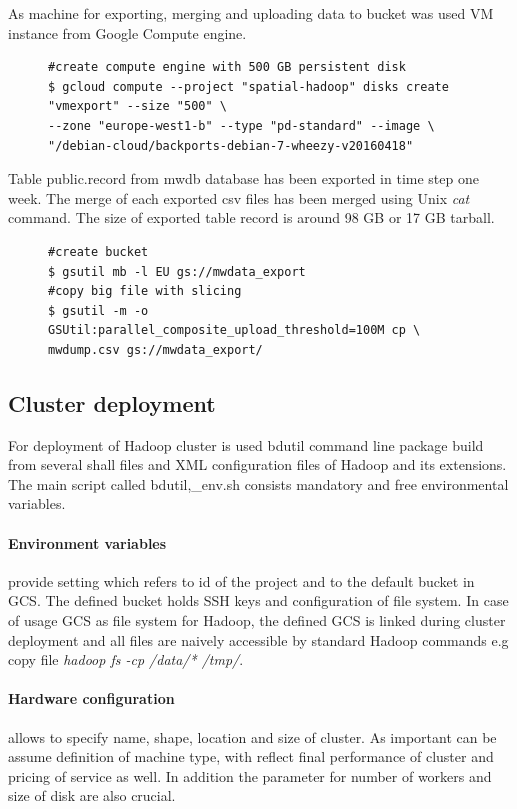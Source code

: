 \documentclass[a4paper,12pt,oneside]{report}
\begin{document}
As machine for exporting, merging and uploading data to bucket was used VM instance from Google Compute engine.
\begin{figure}[!htbp]\lstset{extendedchars=false,escapeinside=''}
\begin{lstlisting}[style=mybash]
#create compute engine with 500 GB persistent disk
$ gcloud compute --project "spatial-hadoop" disks create "vmexport" --size "500" \
--zone "europe-west1-b" --type "pd-standard" --image \
"/debian-cloud/backports-debian-7-wheezy-v20160418"
\end{lstlisting} \end{figure}
Table public.record from mwdb database has been exported in time step one week. The merge of each exported csv files has been merged using Unix \textit{cat} command. The size of exported table record is around 98 GB or 17 GB tarball.

\begin{figure}[!htbp]\lstset{extendedchars=false,escapeinside=''}
\begin{lstlisting}[style=mybash]
#create bucket 
$ gsutil mb -l EU gs://mwdata_export
#copy big file with slicing
$ gsutil -m -o GSUtil:parallel_composite_upload_threshold=100M cp \
mwdump.csv gs://mwdata_export/
\end{lstlisting} \end{figure}


		\subsection{Cluster deployment}
For deployment of Hadoop cluster is used bdutil command line package build from several shall files and XML configuration files of Hadoop and its extensions. The main script called bdutil,\_env.sh consists mandatory and free environmental variables.

\paragraph{Environment variables}
provide setting which refers to id of the project and to the default bucket in GCS. The defined bucket holds SSH keys and configuration of file system. In case of usage GCS as file system for Hadoop, the defined GCS is linked  during cluster deployment and all files are naively accessible by standard Hadoop commands e.g copy file \textit{hadoop fs -cp  /data/* /tmp/}.

\paragraph{Hardware configuration} 
allows to specify name, shape, location and size of cluster. As important can be assume definition of machine type, with reflect final performance of cluster and pricing of service as well. In addition the parameter for number of workers and size of disk are also crucial.
\end{document}
